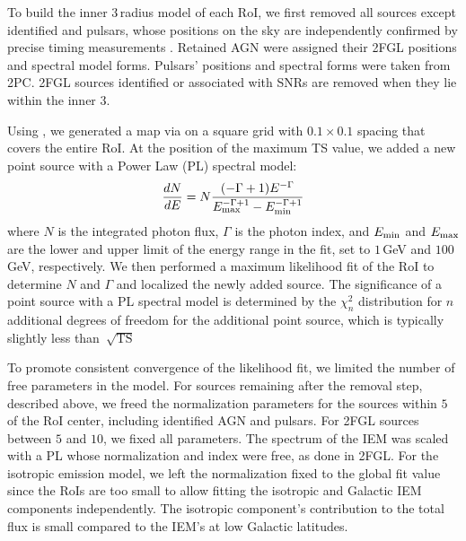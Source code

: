 {To build the inner $3$\degr{}\,radius model of each RoI, we first removed all sources except identified \agn{} and pulsars, whose positions on the sky are independently confirmed by precise timing measurements \citep{2PC}. Retained AGN were assigned their 2FGL positions and spectral model forms. Pulsars' positions and spectral forms were taken from 2PC. 2FGL sources identified or associated with SNRs are removed when they lie within the inner $3$\degr{}. 

Using \srcs{}, we generated a \ts{} map via \ptlike{} on a square grid with $0.1$\degr{}\,$\times$\,$0.1$\degr{} spacing that covers the entire RoI. At the position of the maximum TS value, we added a new point source with a Power Law (PL) spectral model:
\begin{equation}
\label{eqn:PL}
\frac{dN}{dE} = N\frac{(-\Gamma+1)E^{-\Gamma}} {E_{\rm max}^{-\Gamma+1} - E_{\rm min}^{-\Gamma+1}}
\end{equation}
where $N$ is the integrated photon flux, $\Gamma$ is the photon index, and $E_{\rm min}$ and $E_{\rm max}$ are the lower and upper limit of the energy range in the fit, set to $1$\,GeV and $100$\,GeV, respectively.
We then performed a maximum likelihood fit of the RoI to determine $N$ and $\Gamma$ and localized the newly added source. 
The significance of a point source with a PL spectral model is determined by the $\chi^2_n$ distribution for $n$ additional degrees of freedom for the additional point source, which is typically slightly less than~$\sqrt{\textrm{TS}}$

To promote consistent convergence of the likelihood fit, we limited the number of free parameters in the model. For sources remaining after the removal step, described above, we freed the normalization parameters for the sources within $5$\degr{} of the RoI center, including identified AGN and pulsars. For 2FGL sources between $5$\degr{} and $10$\degr{}, we fixed all parameters. The spectrum of the IEM was scaled with a PL whose normalization and index were free, as done in 2FGL. For the isotropic emission model, we left the normalization fixed to the global fit value since the RoIs are too small to allow fitting the isotropic and Galactic IEM components independently. The isotropic component's contribution to the total flux is small compared to the IEM's at low Galactic latitudes.

}
